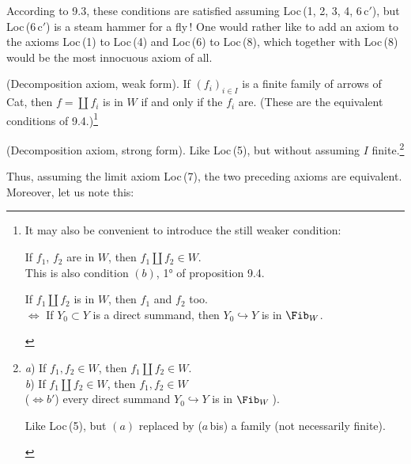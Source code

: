 
According to 9.3, these conditions are satisfied assuming Loc\,(1, 2, 3, 4, 6\,c$'$), but Loc\,(6\,c$'$) is a steam hammer for a fly\,! One would rather like to add an axiom to the axioms Loc\,(1) to Loc\,(4) and Loc\,(6) to Loc\,(8), which together with Loc\,(8) would be the most innocuous axiom of all.

\begin{description}[labelwidth=5.5em,leftmargin=6.5em,style=sameline]
\item[Loc\,(5)] (Decomposition axiom, weak form). If $(f_i)_{i\in I}$ is a finite family of arrows of Cat, then $f=\coprod f_i$ is in $W$ if and only if the $f_i$ are. (These are the equivalent conditions of 9.4.)\footnote[48]{It may also be convenient to introduce the still weaker condition:
\begin{description}[nosep,labelwidth=4.5em,leftmargin=5em,style=sameline]
\item[Loc\,(5\,a)] If $f_1$, $f_2$ are in $W$, then $f_1\amalg f_2\in W$.\\
This is also condition $(b)$, 1° of proposition 9.4.
\item[Loc\,(5\,b)] If $f_1\amalg f_2$ is in $W$, then $f_1$ and $f_2$ too.\\
$\iff$ If $Y_0\subset Y$ is a direct summand, then $Y_0\hookrightarrow Y$ is in $\Fib_W$.
\end{description}}

\item[Loc\,(5\,bis)] (Decomposition axiom, strong form). Like Loc\,(5), but without assuming $I$ finite.\footnote[49]{
\begin{description}[nosep,labelwidth=4.5em,leftmargin=5em,style=sameline]
\item[Loc\,(5)] \textit{a}) If $f_1,f_2\in W$, then $f_1\amalg f_2\in W$.\\
\textit{b}) If $f_1\amalg f_2\in W$, then $f_1,f_2\in W$\\
($\iff b'$) every direct summand $Y_0\hookrightarrow Y$ is in $\Fib_W$\,).
\item[Loc\,(5\,bis)] Like Loc\,(5), but $(a)$ replaced by ($a$\,bis) a family (not necessarily finite).
\end{description}}
\end{description}

Thus, assuming the limit axiom Loc\,(7), the two preceding axioms are equivalent. Moreover, let us note this:

